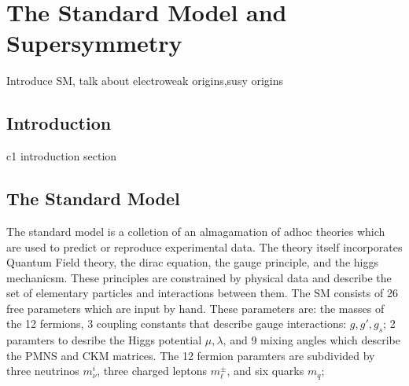



\setcounter{secnumdepth}{3}
\setcounter{tocdepth}{3}
\setlength{\parskip}{\smallskipamount}
\setlength{\parindent}{0pt}


\makeatletter


\providecommand{\tabularnewline}{\\}


\makeatother

%

\chapter{The Standard Model and Supersymmetry}

\begin{chapterabstract}
Introduce SM, talk about electroweak origins,susy origins
\end{chapterabstract}

\section{Introduction}

c1 introduction section

\section{The Standard Model}

The standard model is a colletion of an almagamation of adhoc theories which are used to predict or reproduce experimental data. The theory itself incorporates Quantum Field theory, the dirac equation, the gauge principle, and the higgs mechanicsm. These principles are constrained by physical data and describe the set of elementary particles and interactions between them. The SM  consists of 26 free parameters which are input by hand. These parameters are: the masses of the 12 fermions, 3 coupling constants that describe gauge interactions: $g, g', g_s$; 2 paramters to desribe the Higgs potential $\mu, \lambda$, and 9 mixing angles which describe the  PMNS and CKM matrices. The 12 fermion paramters are subdivided by three neutrinos $m_\nu^i$, three charged leptons $m_\ell^\pm$, and six quarks $m_q$; 

